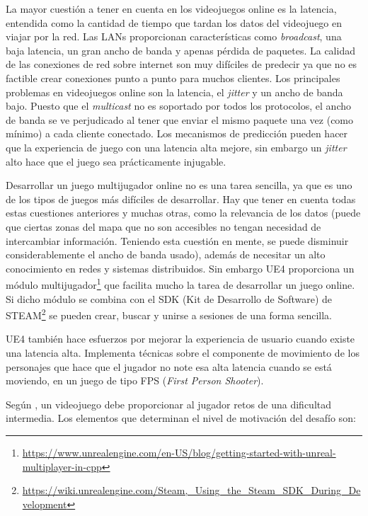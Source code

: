 La mayor cuestión a tener en cuenta en los videojuegos online es la latencia, entendida como la cantidad de tiempo que tardan los datos del videojuego en viajar por la red. Las LANs proporcionan características como \textit{broadcast}, una baja latencia, un gran ancho de banda y apenas pérdida de paquetes. La calidad de las conexiones de red sobre internet son muy difíciles de predecir ya que no es factible crear conexiones punto a punto para muchos clientes. Los principales problemas en videojuegos online \cite{9} son la latencia, el \textit{jitter} y un ancho de banda bajo. Puesto que el \textit{multicast} no es soportado por todos los protocolos, el ancho de banda se ve perjudicado al tener que enviar el mismo paquete una vez (como mínimo) a cada cliente conectado. Los mecanismos de predicción pueden hacer que la experiencia de juego con una latencia alta mejore, sin embargo un \textit{jitter} alto hace que el juego sea prácticamente injugable.

Desarrollar un juego multijugador online no es una tarea sencilla, ya que es uno de los tipos de juegos más difíciles de desarrollar. Hay que tener en cuenta todas estas cuestiones anteriores y muchas otras, como la relevancia de los datos (puede que ciertas zonas del mapa que no son accesibles no tengan necesidad de intercambiar información. Teniendo esta cuestión en mente, se puede disminuir considerablemente el ancho de banda usado), además de necesitar un alto conocimiento en redes y sistemas distribuidos. Sin embargo \acs{UE4} proporciona un módulo multijugador\footnote{\url{https://www.unrealengine.com/en-US/blog/getting-started-with-unreal-multiplayer-in-cpp}} que facilita mucho la tarea de desarrollar un juego online. Si dicho módulo se combina con el SDK (Kit de Desarrollo de Software) de STEAM\footnote{\url{https://wiki.unrealengine.com/Steam,_Using_the_Steam_SDK_During_Development}} se pueden crear, buscar y unirse a sesiones de una forma sencilla.

\acs{UE4} también hace esfuerzos por mejorar la experiencia de usuario cuando existe una latencia alta. Implementa técnicas sobre el componente de movimiento de los personajes que hace que el jugador no note esa alta latencia cuando se está moviendo, en un juego de tipo FPS (\textit{First Person Shooter}).

Según \cite{10}, un videojuego debe proporcionar al jugador retos de una dificultad intermedia. Los elementos que determinan el nivel de motivación del desafío son:

\newpage

